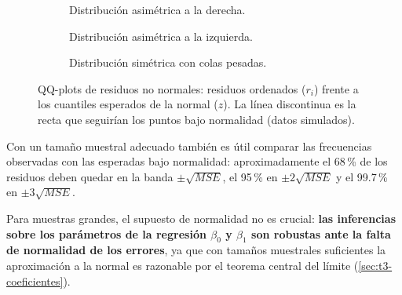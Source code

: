 \begin{figure}[H]
  \centering
  \begin{subfigure}[t]{0.32\linewidth}
    \centering
    \caption{Distribución asimétrica a la derecha.}
  \end{subfigure}\hfill
  \begin{subfigure}[t]{0.32\linewidth}
    \centering
    \caption{Distribución asimétrica a la izquierda.}
  \end{subfigure}\hfill
  \begin{subfigure}[t]{0.32\linewidth}
    \centering
    \caption{Distribución simétrica con colas pesadas.}
  \end{subfigure}
  \caption{QQ-plots de residuos no normales: residuos ordenados ($r_i$) frente a los cuantiles
    esperados de la normal ($z$). La línea discontinua es la recta que seguirían los puntos bajo
    normalidad (datos simulados).}
\end{figure}

Con un tamaño muestral adecuado también es útil comparar las frecuencias observadas con las
esperadas bajo normalidad: aproximadamente el 68\,\% de los residuos deben quedar en la banda
$\pm\sqrt{MSE}$, el 95\,\% en $\pm2\sqrt{MSE}$ y el 99.7\,\% en $\pm3\sqrt{MSE}$.

Para muestras grandes, el supuesto de normalidad no es crucial: \textbf{las inferencias sobre los
parámetros de la regresión $\beta_0$ y $\beta_1$ son robustas ante la falta de normalidad de los
errores}, ya que con tamaños muestrales suficientes la aproximación a la normal es razonable por
el teorema central del límite (\cref{sec:t3-coeficientes}).

